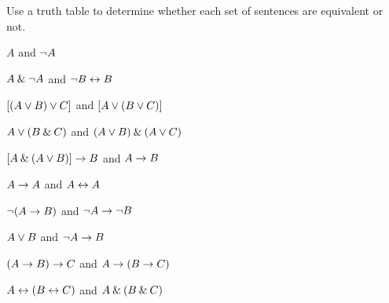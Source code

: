 \problempart
\label{pr.TT.equiv}
Use a truth table to determine whether each set of sentences are equivalent or not.
\begin{earg}
\item $A$ and ${\neg} A$
\item $A \mathbin{\&} {\neg} A$ and ${\neg} B \leftrightarrow B$
\item $[(A \vee B) \vee C]$ and $[A \vee (B \vee C)]$
\item $A \vee (B \mathbin{\&} C)$ and $(A \vee B) \mathbin{\&} (A \vee C)$
\item $[A \mathbin{\&} (A \vee B)] \rightarrow B$ and $A \rightarrow B$

\item $A\rightarrow A$ and $A \leftrightarrow A$
\item ${\neg}(A \rightarrow B)$ and ${\neg} A \rightarrow {\neg} B$
\item $A \vee B$ and ${\neg} A \rightarrow B$
\item$(A \rightarrow B) \rightarrow C$ and $A \rightarrow (B \rightarrow C)$
\item $A \leftrightarrow (B \leftrightarrow C)$ and $A \mathbin{\&} (B \mathbin{\&} C)$
\end{earg}


